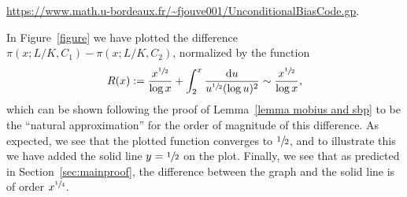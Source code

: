 \documentclass[JEP,XML,SOM,Unicode,NoEqCountersInSection,NoFloatCountersInSection,published]{cedram}
\theoremstyle{definition}
\renewcommand{\d}{\mathrm{d}}
\begin{document}
\noindent
\url{https://www.math.u-bordeaux.fr/~fjouve001/UnconditionalBiasCode.gp}.

\noindent
In Figure~\ref{figure} we have plotted the difference $\pi(x;L/K,C_1) -\pi(x;L/K,C_2)$, normalized by the function
\[R(x):= \frac {x^{\sfrac 12}}{\log x}+ \int_2^{x} \frac{\d u}{u^{\sfrac 12} (\log u)^2}\sim \frac {x^{\sfrac 12}}{\log x},\]
which can be shown following the proof of Lemma~\ref{lemma mobius and sbp} to be the ``natural approximation'' for the order of magnitude of this difference. As expected, we see that the plotted function converges to $\sfrac 12$, and to illustrate this we have added the solid line $y=\sfrac 12$ on the plot. Finally, we see that as predicted in Section~\ref{sec:mainproof}, the difference between the graph and the solid line is of order $x^{\sfrac 14}$.


\backmatter


\end{document}
